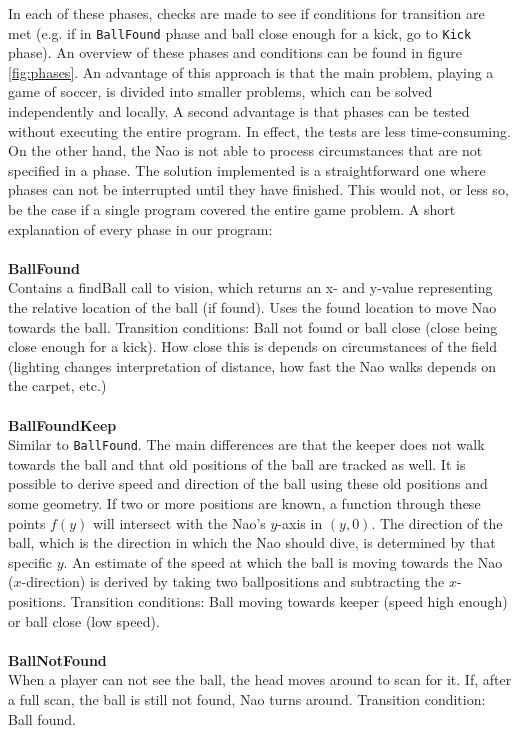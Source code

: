 \documentclass[a4paper]{article}
\begin{document}
In each of these phases, checks are made to see if conditions for transition are met (e.g. if in \texttt{BallFound} phase and ball close enough for a kick, go to \texttt{Kick} phase). An overview of these phases and conditions can be found in figure \ref{fig:phases}. An advantage of this approach is that the main problem, playing a game of soccer, is divided into smaller problems, which can be solved independently and locally. A second advantage is that phases can be tested without executing the entire program. In effect, the tests are less time-consuming. On the other hand, the Nao is not able to process circumstances that are not specified in a phase. The solution implemented is a straightforward one where phases can not be interrupted until they have finished. This would not, or less so, be the case if a single program covered the entire game problem. A short explanation of every phase in our program:\\\\
\textbf{BallFound} \\
Contains a findBall call to vision, which returns an x- and y-value representing the relative location of the ball (if found). Uses the found location to move Nao towards the ball. Transition conditions: Ball not found or ball close (close being close enough for a kick). How close this is depends on circumstances of the field (lighting changes interpretation of distance, how fast the Nao walks depends on the carpet, etc.) \\\\
\textbf{BallFoundKeep} \\
Similar to \texttt{BallFound}. The main differences are that the keeper does not walk towards the ball and that old positions of the ball are tracked as well. It is possible to derive speed and direction of the ball using these old positions and some geometry. If two or more positions are known, a function through these points $f(y)$ will intersect with the Nao's $y$-axis in $(y,0)$. The direction of the ball, which is the direction in which the Nao should dive, is determined by that specific $y$. An estimate of the speed at which the ball is moving towards the Nao ($x$-direction) is derived by taking two ballpositions and subtracting the $x$-positions. Transition conditions: Ball moving towards keeper (speed high enough) or ball close (low speed).\\\\
\textbf{BallNotFound} \\
When a player can not see the ball, the head moves around to scan for it. If, after a full scan, the ball is still not found, Nao turns around. Transition condition: Ball found.\\\\
\end{document}
